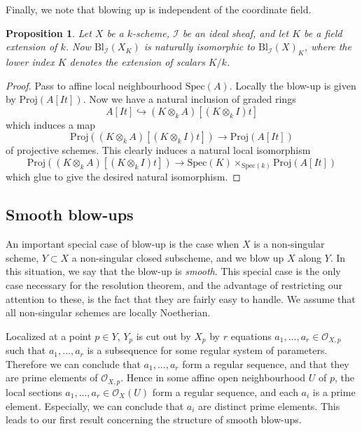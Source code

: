 \documentclass[12pt,a4paper,leqno]{article}
\newcommand{\OO}{\mathcal{O}}
\newcommand{\spec}{\mathrm{Spec}}
\newcommand{\bl}{\mathrm{Bl}}
\newcommand{\proj}{\mathrm{Proj}}
\theoremstyle{plain}
\newtheorem{prop}[theo]{Proposition}
\theoremstyle{definition}
\theoremstyle{remark}
\begin{document}
Finally, we note that blowing up is independent of the coordinate field.

\begin{prop}
Let $X$ be a $k$-scheme, $\mathscr{I}$ be an ideal sheaf, and let $K$ be a field extension of $k$. Now $\bl_{\mathscr{I}} (X_K)$ is naturally isomorphic to $\bl_{\mathscr{I}} (X)_K$, where the lower index $K$ denotes the extension of scalars $K / k$.
\end{prop}
\begin{proof}
Pass to affine local neighbourhood $\spec (A)$. Locally the blow-up is given by $\proj (A[It])$. Now we have a natural inclusion of graded rings
\begin{equation*}
A [I t] \hookrightarrow (K \otimes_k A) [(K \otimes_k I) t]
\end{equation*}
which induces a map
\begin{equation*}
\proj ((K \otimes_k A) [(K \otimes_k I) t]) \to \proj (A [I t])
\end{equation*} 
of projective schemes. This clearly induces a natural local isomorphism
\begin{equation*}
\proj ((K \otimes_k A) [(K \otimes_k I) t]) \to \spec (K)  \times_{\spec (k)} \proj (A [I t])
\end{equation*}
which glue to give the desired natural isomorphism.
\end{proof}

\subsection{Smooth blow-ups}

An important special case of blow-up is the case when $X$ is a non-singular scheme, $Y \subset X$ a non-singular closed subscheme, and we blow up $X$ along $Y$. In this situation, we say that the blow-up is \emph{smooth}. This special case is the only case necessary for the resolution theorem, and the advantage of restricting our attention to these, is the fact that they are fairly easy to handle. We assume that all non-singular schemes are locally Noetherian.

Localized at a point $p \in Y$, $Y_p$ is cut out by $X_p$ by $r$ equations $a_1,...,a_r \in \OO_{X,p}$ such that $a_1,...,a_r$ is a subsequence for some regular system of parameters. Therefore we can conclude that $a_1, ..., a_r$ form a regular sequence, and that they are prime elements of $\OO_{X,p}$. Hence in some affine open neighbourhood $U$ of $p$, the local sections $a_1,...,a_r \in \OO_X(U)$ form a regular sequence, and each $a_i$ is a prime element. Especially, we can conclude that $a_i$ are distinct prime elements. This leads to our first result concerning the structure of smooth blow-ups.
\end{document}
